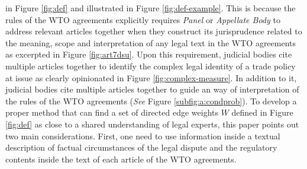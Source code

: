 in Figure \ref{fig:def} and illustrated in Figure \ref{fig:def-example}. This is because the rules of the WTO agreements
explicitly requires \textit{Panel} or \textit{Appellate Body} to address
relevant articles together when they construct its jurisprudence related to the meaning, scope and interpretation of any legal text in the WTO agreements as excerpted in Figure \ref{fig:art7dsu}.
Upon this requirement, judicial bodies cite
multiple articles together
to identify the complex legal identity of a trade policy at issue as clearly opinionated in Figure \ref{fig:complex-measure}.
In addition to it, judicial bodies cite multiple articles together
to guide an way of interpretation of the rules of the WTO agreements (\textit{See} Figure \ref{subfig:a:condprob}).
To develop a proper method that can find a set of directed edge weights $W$ defined in Figure \ref{fig:def}
as close to a shared understanding of legal experts, this paper points out two main considerations.
First, one need to use information inside a textual description of factual circumstances of the legal dispute and the regulatory contents inside the text of each article of the WTO agreements.
